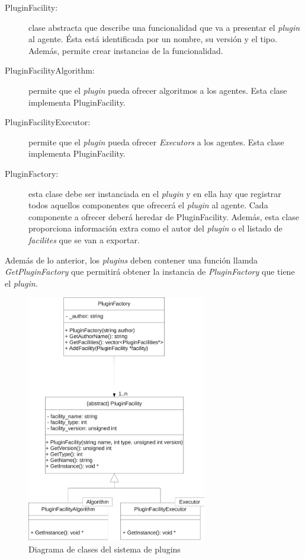 \begin{description}
	\item[PluginFacility:] clase abstracta que describe una funcionalidad que va a presentar el \emph{plugin} al agente. Ésta está identificada por un nombre, su versión y el tipo. Además, permite crear instancias de la funcionalidad.
	
	\item[PluginFacilityAlgorithm:] permite que el \emph{plugin} pueda ofrecer algoritmos a los agentes. Esta clase implementa PluginFacility.
	
	\item[PluginFacilityExecutor:] permite que el \emph{plugin} pueda ofrecer \emph{Executors} a los agentes. Esta clase implementa PluginFacility.
	
	\item[PluginFactory:] esta clase debe ser instanciada en el \emph{plugin} y en ella hay que registrar todos aquellos componentes que ofrecerá el \emph{plugin} al agente. Cada componente a ofrecer deberá heredar de PluginFacility. Además, esta clase proporciona información extra como el autor del \emph{plugin} o el listado de \emph{facilites} que se van a exportar.
\end{description}

Además de lo anterior, los \emph{plugins} deben contener una función llamda \emph{GetPluginFactory} que permitirá obtener la instancia de \emph{PluginFactory} que tiene el \emph{plugin}.

\begin{figure}
	\centering
	\includegraphics[width=0.7\textwidth]{images/plugins.pdf}
	\caption{Diagrama de clases del sistema de plugins}\label{fig:plugins}
\end{figure}


